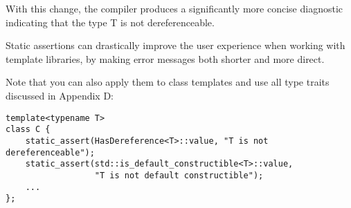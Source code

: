 With this change, the compiler produces a significantly more concise diagnostic indicating that the type T is not dereferenceable.

Static assertions can drastically improve the user experience when working with template libraries, by making error messages both shorter and more direct.

Note that you can also apply them to class templates and use all type traits discussed in Appendix D:

\begin{lstlisting}[style=styleCXX]
template<typename T>
class C {
	static_assert(HasDereference<T>::value, "T is not dereferenceable");
	static_assert(std::is_default_constructible<T>::value,
				  "T is not default constructible");
	...
};
\end{lstlisting}




































